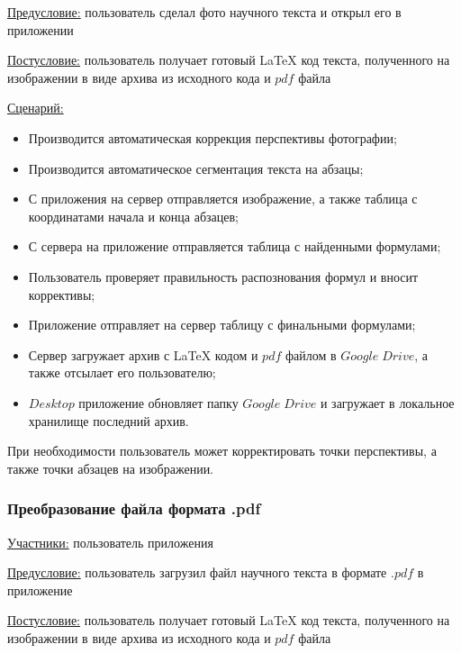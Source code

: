 \underline{Предусловие:} пользователь сделал фото научного текста и открыл его в приложении

\underline{Постусловие:} пользователь получает готовый \LaTeX\; код текста, полученного на изображении в виде архива из исходного кода и $pdf$ файла

\underline{Сценарий:}
\begin{itemize}
    \item Производится автоматическая коррекция перспективы фотографии;
    \item Производится автоматическое сегментация текста на абзацы;
    \item С приложения на сервер отправляется изображение, а также таблица с координатами начала и конца абзацев;
    \item С сервера на приложение отправляется таблица с найденными формулами;
    \item Пользователь проверяет правильность распознования формул и вносит коррективы;
    \item Приложение отправляет на сервер таблицу с финальными формулами;
    \item Сервер загружает архив с \LaTeX\; кодом и $pdf$ файлом в $Google\;Drive$, а также отсылает его пользователю;
    \item $Desktop$ приложение обновляет папку $Google\;Drive$ и загружает в локальное хранилище последний архив.
\end{itemize}

При необходимости пользователь может корректировать точки перспективы, а также точки абзацев на изображении.

\subsubsection{Преобразование файла формата .pdf}
\underline{Участники:} пользователь приложения

\underline{Предусловие:} пользователь загрузил файл научного текста в формате $.pdf$ в приложение

\underline{Постусловие:} пользователь получает готовый \LaTeX\; код текста, полученного на изображении в виде архива из исходного кода и $pdf$ файла

